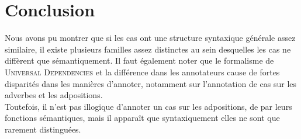 \documentclass{article}
\begin{document}
\section{Conclusion}
Nous avons pu montrer que si les cas ont une structure syntaxique générale assez similaire, il existe plusieurs familles assez distinctes au sein desquelles les cas ne diffèrent que sémantiquement.
Il faut également noter que le formalisme de \textsc{Universal Dependencies} et la différence dans les annotateurs cause de fortes disparités dans les manières d'annoter, notamment sur l'annotation de cas sur les adverbes et les adpositions.\\
Toutefois, il n'est pas illogique d'annoter un cas sur les adpositions, de par leurs fonctions sémantiques, mais il apparaît que syntaxiquement elles ne sont que rarement distinguées.

\appendix



\end{document}
